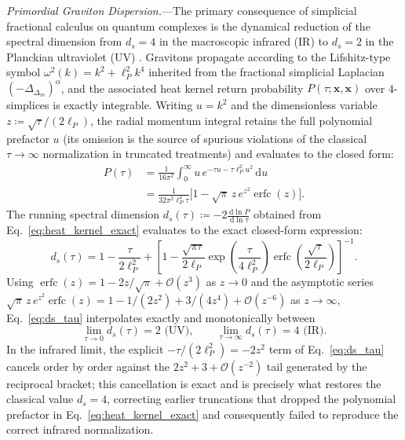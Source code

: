 \documentclass[aps,prl,reprint,twocolumn,superscriptaddress,nofootinbib,floatfix]{revtex4-2}
\newcommand{\dif}{\,\mathrm{d}}
\begin{document}
\emph{Primordial Graviton Dispersion.}---The primary consequence of simplicial fractional calculus on quantum complexes is the dynamical reduction of the spectral dimension from $d_s = 4$ in the macroscopic infrared (IR) to $d_s = 2$ in the Planckian ultraviolet (UV) \cite{ambjorn2005spectral, silvafilho2026grand}. Gravitons propagate according to the Lifshitz-type symbol $\omega^2(k) = k^2 + \ell_P^2 k^4$ inherited from the fractional simplicial Laplacian $(-\Delta_{\Delta_m})^\alpha$, and the associated heat kernel return probability $P(\tau; \mathbf{x}, \mathbf{x})$ over 4-simplices is exactly integrable. Writing $u = k^2$ and the dimensionless variable $z \coloneqq \sqrt{\tau}/(2\ell_P)$, the radial momentum integral retains the full polynomial prefactor $u$ (its omission is the source of spurious violations of the classical $\tau \to \infty$ normalization in truncated treatments) and evaluates to the closed form:
\begin{align}
    \label{eq:heat_kernel_exact}
    P(\tau) &= \frac{1}{16\pi^2} \int_0^\infty u\, e^{-\tau u - \tau \ell_P^2 u^2} \dif u \nonumber \\
    &= \frac{1}{32\pi^2 \ell_P^2 \tau} \Big[ 1 - \sqrt{\pi}\, z\, e^{z^2} \operatorname{erfc}(z) \Big].
\end{align}
The running spectral dimension $d_s(\tau) \coloneqq -2 \frac{\dif \ln P}{\dif \ln \tau}$ obtained from Eq.~\eqref{eq:heat_kernel_exact} evaluates to the exact closed-form expression:
\begin{equation}
    \label{eq:ds_tau}
    d_s(\tau) = 1 - \frac{\tau}{2\ell_P^2} + \left[ 1 - \frac{\sqrt{\pi \tau}}{2\ell_P} \exp\!\left( \frac{\tau}{4\ell_P^2} \right) \operatorname{erfc}\!\left( \frac{\sqrt{\tau}}{2\ell_P} \right) \right]^{-1}.
\end{equation}
Using $\operatorname{erfc}(z) = 1 - 2z/\sqrt{\pi} + \mathcal{O}(z^3)$ as $z \to 0$ and the asymptotic series $\sqrt{\pi}\, z\, e^{z^2} \operatorname{erfc}(z) = 1 - 1/(2z^2) + 3/(4z^4) + \mathcal{O}(z^{-6})$ as $z \to \infty$, Eq.~\eqref{eq:ds_tau} interpolates exactly and monotonically between
\begin{equation}
    \label{eq:ds_limits}
    \lim_{\tau \to 0} d_s(\tau) = 2 \text{ (UV)}, \qquad \lim_{\tau \to \infty} d_s(\tau) = 4 \text{ (IR)}.
\end{equation}
In the infrared limit, the explicit $-\tau/(2\ell_P^2) = -2z^2$ term of Eq.~\eqref{eq:ds_tau} cancels order by order against the $2z^2 + 3 + \mathcal{O}(z^{-2})$ tail generated by the reciprocal bracket; this cancellation is exact and is precisely what restores the classical value $d_s = 4$, correcting earlier truncations that dropped the polynomial prefactor in Eq.~\eqref{eq:heat_kernel_exact} and consequently failed to reproduce the correct infrared normalization.
\end{document}
